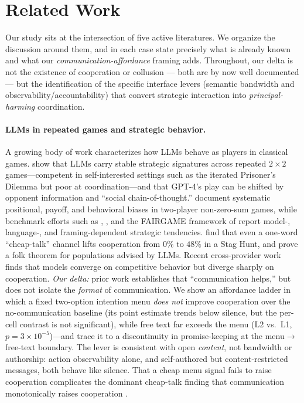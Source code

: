 \section{Related Work}
\label{sec:related_work}

Our study sits at the intersection of five active literatures. We organize the discussion
around them, and in each case state precisely what is already known and what our
\emph{communication-affordance} framing adds. Throughout, our delta is not the existence
of cooperation or collusion --- both are by now well documented --- but the identification
of the specific interface levers (semantic bandwidth and observability/accountability)
that convert strategic interaction into \emph{principal-harming} coordination.

\paragraph{LLMs in repeated games and strategic behavior.}
A growing body of work characterizes how LLMs behave as players in classical games.
\citet{akata2025repeated} show that LLMs carry stable strategic signatures across repeated
$2{\times}2$ games---competent in self-interested settings such as the iterated Prisoner's
Dilemma but poor at coordination---and that GPT-4's play can be shifted by opponent
information and ``social chain-of-thought.'' \citet{herr2024strategic} document systematic
positional, payoff, and behavioral biases in two-player non-zero-sum games, while benchmark
efforts such as \citet{duan2024gtbench}, \citet{costarelli2024gamebench}, and the
\textsc{FAIRGAME} framework of \citet{buscemi2025fairgame} report model-, language-, and
framing-dependent strategic tendencies. \citet{madmoun2025communication} find that even a
one-word ``cheap-talk'' channel lifts cooperation from $0\%$ to $48\%$ in a Stag Hunt, and
\citet{shaki2026folk} prove a folk theorem for populations advised by LLMs. Recent
cross-provider work \citep{affonso2026converge} finds that models converge on competitive
behavior but diverge sharply on cooperation. \emph{Our delta:} prior work establishes that
``communication helps,'' but does not isolate the \emph{format} of communication. We show an
affordance ladder in which a fixed two-option intention menu \emph{does not} improve cooperation
over the no-communication baseline (its point estimate trends below silence, but the per-cell
contrast is not significant), while free text far exceeds the menu
(L2 vs.\ L1, $p{=}3{\times}10^{-5}$)---and trace it to a discontinuity in promise-keeping at the
menu$\rightarrow$free-text boundary. The lever is consistent with open \emph{content}, not
bandwidth or authorship: action observability alone, and self-authored but content-restricted
messages, both behave like silence. That a cheap menu signal fails to raise cooperation
complicates the dominant cheap-talk finding that communication monotonically raises cooperation
\citep{sally1995conversation}.

